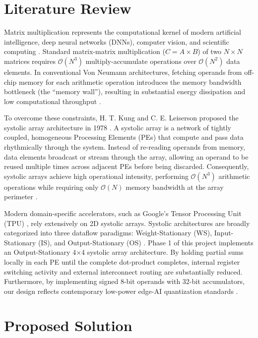 \documentclass[conference]{IEEEtran}
\begin{document}
\section{Literature Review}
Matrix multiplication represents the computational kernel of modern artificial intelligence, deep neural networks (DNNs), computer vision, and scientific computing \cite{jouppi2017}. Standard matrix-matrix multiplication ($C = A \times B$) of two $N \times N$ matrices requires $\mathcal{O}(N^3)$ multiply-accumulate operations over $\mathcal{O}(N^2)$ data elements. In conventional Von Neumann architectures, fetching operands from off-chip memory for each arithmetic operation introduces the memory bandwidth bottleneck (the ``memory wall''), resulting in substantial energy dissipation and low computational throughput \cite{patterson2020}.

To overcome these constraints, H. T. Kung and C. E. Leiserson proposed the systolic array architecture in 1978 \cite{kung1978}. A systolic array is a network of tightly coupled, homogeneous Processing Elements (PEs) that compute and pass data rhythmically through the system. Instead of re-reading operands from memory, data elements broadcast or stream through the array, allowing an operand to be reused multiple times across adjacent PEs before being discarded. Consequently, systolic arrays achieve high operational intensity, performing $\mathcal{O}(N^3)$ arithmetic operations while requiring only $\mathcal{O}(N)$ memory bandwidth at the array perimeter \cite{kung1978}.

Modern domain-specific accelerators, such as Google's Tensor Processing Unit (TPU) \cite{jouppi2017}, rely extensively on 2D systolic arrays. Systolic architectures are broadly categorized into three dataflow paradigms: Weight-Stationary (WS), Input-Stationary (IS), and Output-Stationary (OS) \cite{jouppi2017}. Phase 1 of this project implements an Output-Stationary 4$\times$4 systolic array architecture. By holding partial sums locally in each PE until the complete dot-product completes, internal register switching activity and external interconnect routing are substantially reduced. Furthermore, by implementing signed 8-bit operands with 32-bit accumulators, our design reflects contemporary low-power edge-AI quantization standards \cite{patterson2020}.

\section{Proposed Solution}
\end{document}
